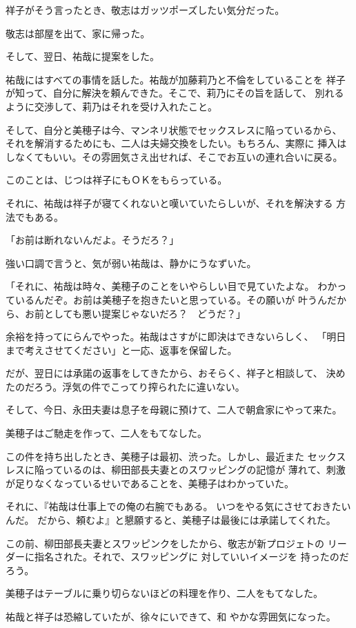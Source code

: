 ﻿\documentclass[
    book,tate,
    line_length=30zw,
    jafontsize=12pt,
    paper=b5j,
    landscape,
    ]{jlreq}
\begin{document}
祥子がそう言ったとき、敬志はガッツポーズしたい気分だった。

敬志は部屋を出て、家に帰った。

そして、翌日、祐哉に提案をした。

祐哉にはすべての事情を話した。祐哉が加藤莉乃と不倫をしていることを
祥子が知って、自分に解決を頼んできた。そこで、莉乃にその旨を話して、
別れるように交渉して、莉乃はそれを受け入れたこと。

そして、自分と美穂子は今、マンネリ状態でセックスレスに陥っているから、
それを解消するためにも、二人は夫婦交換をしたい。もちろん、実際に
挿入はしなくてもいい。その雰囲気さえ出せれば、そこでお互いの連れ合いに戻る。

このことは、じつは祥子にもＯＫをもらっている。

それに、祐哉は祥子が寝てくれないと嘆いていたらしいが、それを解決する
方法でもある。

「お前は断れないんだよ。そうだろ？」

強い口調で言うと、気が弱い祐哉は、静かにうなずいた。

「それに、祐哉は時々、美穂子のことをいやらしい目で見ていたよな。
わかっているんだぞ。お前は美穂子を抱きたいと思っている。その願いが
叶うんだから、お前としても悪い提案じゃないだろ？　どうだ？」

余裕を持ってにらんでやった。祐哉はさすがに即決はできないらしく、
「明日まで考えさせてください」と一応、返事を保留した。

だが、翌日には承諾の返事をしてきたから、おそらく、祥子と相談して、
決めたのだろう。浮気の件でこってり搾られたに違いない。

そして、今日、永田夫妻は息子を母親に預けて、二人で朝倉家にやって来た。

美穂子はご馳走を作って、二人をもてなした。

この件を持ち出したとき、美穂子は最初、渋った。しかし、最近また
セックスレスに陥っているのは、柳田部長夫妻とのスワッピングの記憶が
薄れて、刺激が足りなくなっているせいであることを、美穂子はわかっていた。

それに、『祐哉は仕事上での俺の右腕でもある。 いつをやる気にさせておきたいんだ。
だから、頼むよ』と懇願すると、美穂子は最後には承諾してくれた。

この前、柳田部長夫妻とスワッピンクをしたから、敬志が新プロジェトの
リーダーに指名された。それで、スワッピングに 対していいイメージを
持ったのだろう。

美穂子はテーブルに乗り切らないほどの料理を作り、二人をもてなした。

祐哉と祥子は恐縮していたが、徐々にいできて、和
やかな雰囲気になった。
\end{document}
